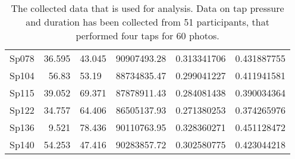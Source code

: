 \begin{table}[!ht]
\begin{tabularx}{\textwidth}{@{}WrZZZr@{}}
Sp078                   & 36.595           & 43.045           & 90907493.28   & 0.313341706                   & 0.431887755                           \\
Sp104                   & 56.83            & 53.19            & 88734835.47   & 0.299041227                   & 0.411941581                           \\
Sp115                   & 39.052           & 69.371           & 87878911.43   & 0.284081438                   & 0.390034364                           \\
Sp122                   & 34.757           & 64.406           & 86505137.93   & 0.271380253                   & 0.374265976                           \\
Sp136                   & 9.521            & 78.436           & 90110763.95   & 0.328360271                   & 0.451128472                           \\
Sp140                   & 54.253           & 47.416           & 90283857.72   & 0.302580775                   & 0.423044218                          
\end{tabularx}
\caption{The collected data that is used for analysis. Data on tap pressure and duration has been collected from 51 participants, that performed four taps for 60 photos.}
\label{tab:results_data}
\end{table}